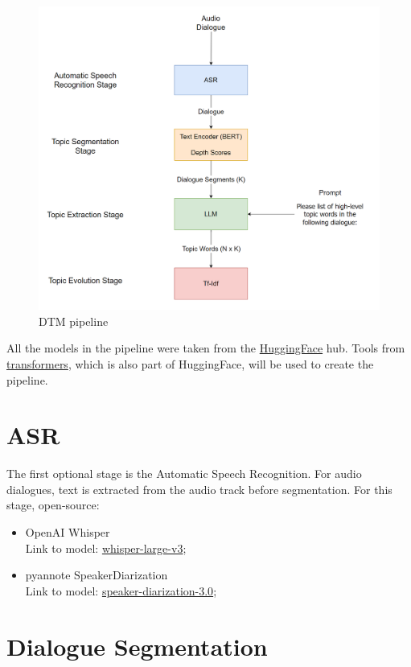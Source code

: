 \documentclass[PMI,VKR]{HSEUniversity}
\begin{document}
\begin{figure}[h]
    \centering
    \includegraphics[scale=0.7]{img/pipeline.png}
    \caption{DTM pipeline}
\end{figure}

All the models in the pipeline were taken from the \href{https://huggingface.co/}{HuggingFace} hub. 
Tools from \href{https://huggingface.co/docs/transformers/index}{transformers}, which is also part of HuggingFace, 
will be used to create the pipeline.

\section{ASR}

The first optional stage is the Automatic Speech Recognition. 
For audio dialogues, text is extracted from the audio track before segmentation. 
For this stage, open-source:
\begin{itemize}
    \item OpenAI Whisper \\
    Link to model: \href{https://huggingface.co/openai/whisper-large-v3}{whisper-large-v3};
    \item pyannote SpeakerDiarization \\
    Link to model: \href{https://huggingface.co/pyannote/speaker-diarization-3.0}{speaker-diarization-3.0};
\end{itemize} 

\section{Dialogue Segmentation}
\end{document}
